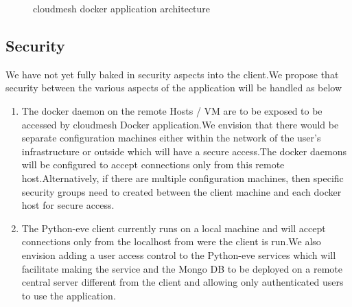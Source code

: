 \documentclass[9pt,twocolumn,twoside]{../../styles/osajnl}
\begin{document}
\begin{figure}[htbp]
\centering
{}
\caption{cloudmesh docker application architecture}
\label{fig:Arch}
\end{figure}

\subsection{Security}

We have not yet fully baked in security aspects into the client.We propose that security between the various aspects of the application will be handled as below

\begin{enumerate}
\item The docker daemon on the remote Hosts / VM are to be exposed to be accessed by cloudmesh Docker application.We envision that there would be separate configuration machines either within the network of the user's infrastructure or outside which will have a secure access.The docker daemons will be configured to accept connections only from this remote host.Alternatively, if there are multiple configuration machines, then specific security groups need to created between the client machine and each docker host for secure access.

\item The Python-eve client currently runs on a local machine and will accept connections only from the localhost from were the client is run.We also envision adding a user access control to the Python-eve services which will facilitate making the service and the Mongo DB to be deployed on a remote central server different from the client and allowing only authenticated users to use the application.
 \end{enumerate}
\end{document}
